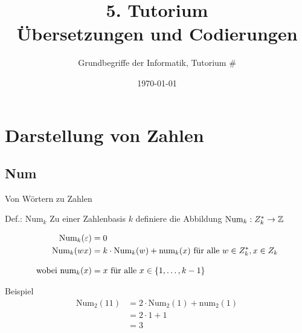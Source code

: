 




\title[Übersetzungen und Codierungen]{5. Tutorium\\ Übersetzungen und Codierungen}
\subtitle{Grundbegriffe der Informatik, Tutorium \#\mytutnumber}
\date{\today}


\usepackage[normalem]{ulem}


\titleframe
\roadmap


\section{Darstellung von Zahlen}

\subsection{Num}
\begin{frame}{Von Wörtern zu Zahlen}
	\begin{block}{Def.: $\text{Num}_k$}
		Zu einer Zahlenbasis $k$ definiere die Abbildung $\text{Num}_k : Z_k^* \to \mathbb{Z}$ 

		\begin{align*}
			\text{Num}_k(\varepsilon) &= 0 \\
			\text{Num}_k(wx) &= k\cdot \text{Num}_k(w) + \text{num}_k(x) \text{ für alle } w\in Z_k^*, x\in Z_k\\[2ex]
			\text{wobei }\text{num}_k(x) &= x \text{ für alle } x \in \left\{ 1,\dots,k-1 \right\}
		\end{align*}
	\end{block}
	\pause
	\begin{exampleblock}{Beispiel}
		\begin{align*}
			\text{Num}_2(11) &= 2\cdot \text{Num}_2(1) + \text{num}_2(1) \\
				&= 2\cdot 1 + 1 \\
				&= 3
		\end{align*}
	\end{exampleblock}
\end{frame}

